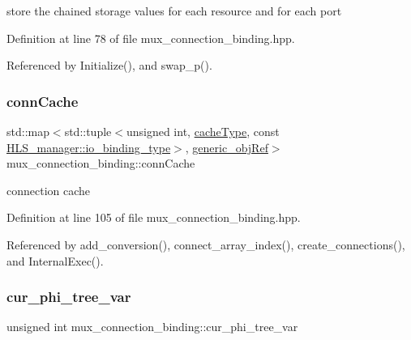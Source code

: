 store the chained storage values for each resource and for each port 



Definition at line 78 of file mux\+\_\+connection\+\_\+binding.\+hpp.



Referenced by Initialize(), and swap\+\_\+p().

\mbox{\label{classmux__connection__binding_a2d3ec6f686648da3f5f4d02ff4f7a2f9}} 
\subsubsection{\texorpdfstring{conn\+Cache}{connCache}}
{\footnotesize\ttfamily std\+::map$<$std\+::tuple$<$unsigned int, \hyperlink{classmux__connection__binding_aaf8d69f505f7832b20e1b0c50c3b6efe}{cache\+Type}, const \hyperlink{classHLS__manager_a972627cc658afa992590b9d2bf1a1e87}{H\+L\+S\+\_\+manager\+::io\+\_\+binding\+\_\+type}$>$, \hyperlink{generic__obj_8hpp_acb533b2ef8e0fe72e09a04d20904ca81}{generic\+\_\+obj\+Ref}$>$ mux\+\_\+connection\+\_\+binding\+::conn\+Cache\hspace{0.3cm}{\ttfamily [private]}}



connection cache 



Definition at line 105 of file mux\+\_\+connection\+\_\+binding.\+hpp.



Referenced by add\+\_\+conversion(), connect\+\_\+array\+\_\+index(), create\+\_\+connections(), and Internal\+Exec().

\mbox{\label{classmux__connection__binding_a7ba6eaf97161963dc246e6db966e6386}} 
\subsubsection{\texorpdfstring{cur\+\_\+phi\+\_\+tree\+\_\+var}{cur\_phi\_tree\_var}}
{\footnotesize\ttfamily unsigned int mux\+\_\+connection\+\_\+binding\+::cur\+\_\+phi\+\_\+tree\+\_\+var\hspace{0.3cm}{\ttfamily [private]}}



